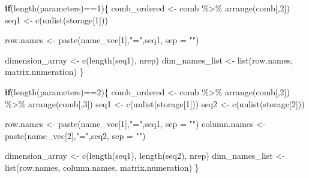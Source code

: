 \documentclass[11pt,a4paper]{article}
\newenvironment{Shaded}{\begin{snugshade}}{\end{snugshade}}
\newcommand{\AttributeTok}[1]{\textcolor[rgb]{0.77,0.63,0.00}{#1}}
\newcommand{\ControlFlowTok}[1]{\textcolor[rgb]{0.13,0.29,0.53}{\textbf{#1}}}
\newcommand{\DecValTok}[1]{\textcolor[rgb]{0.00,0.00,0.81}{#1}}
\newcommand{\FunctionTok}[1]{\textcolor[rgb]{0.00,0.00,0.00}{#1}}
\newcommand{\NormalTok}[1]{#1}
\newcommand{\OtherTok}[1]{\textcolor[rgb]{0.56,0.35,0.01}{#1}}
\newcommand{\SpecialCharTok}[1]{\textcolor[rgb]{0.00,0.00,0.00}{#1}}
\newcommand{\StringTok}[1]{\textcolor[rgb]{0.31,0.60,0.02}{#1}}
\begin{document}
\begin{Shaded}
\begin{Highlighting}[]
  \ControlFlowTok{if}\NormalTok{(}\FunctionTok{length}\NormalTok{(parameters)}\SpecialCharTok{==}\DecValTok{1}\NormalTok{)\{}
\NormalTok{    comb\_ordered }\OtherTok{\textless{}{-}}\NormalTok{  comb }\SpecialCharTok{\%\textgreater{}\%} \FunctionTok{arrange}\NormalTok{(comb[,}\DecValTok{2}\NormalTok{])}
\NormalTok{    seq1 }\OtherTok{\textless{}{-}} \FunctionTok{c}\NormalTok{(}\FunctionTok{unlist}\NormalTok{(storage[}\DecValTok{1}\NormalTok{]))}
    
\NormalTok{    row.names }\OtherTok{\textless{}{-}} \FunctionTok{paste}\NormalTok{(name\_vec[}\DecValTok{1}\NormalTok{],}\StringTok{"="}\NormalTok{,seq1, }\AttributeTok{sep =} \StringTok{""}\NormalTok{)}
    
\NormalTok{    dimension\_array }\OtherTok{\textless{}{-}} \FunctionTok{c}\NormalTok{(}\FunctionTok{length}\NormalTok{(seq1), nrep)}
\NormalTok{    dim\_names\_list }\OtherTok{\textless{}{-}} \FunctionTok{list}\NormalTok{(row.names, matrix.numeration)}
\NormalTok{  \}}
  
  \ControlFlowTok{if}\NormalTok{(}\FunctionTok{length}\NormalTok{(parameters)}\SpecialCharTok{==}\DecValTok{2}\NormalTok{)\{}
\NormalTok{    comb\_ordered }\OtherTok{\textless{}{-}}\NormalTok{  comb }\SpecialCharTok{\%\textgreater{}\%} \FunctionTok{arrange}\NormalTok{(comb[,}\DecValTok{2}\NormalTok{])  }\SpecialCharTok{\%\textgreater{}\%} \FunctionTok{arrange}\NormalTok{(comb[,}\DecValTok{3}\NormalTok{])}
\NormalTok{    seq1 }\OtherTok{\textless{}{-}} \FunctionTok{c}\NormalTok{(}\FunctionTok{unlist}\NormalTok{(storage[}\DecValTok{1}\NormalTok{]))}
\NormalTok{    seq2 }\OtherTok{\textless{}{-}} \FunctionTok{c}\NormalTok{(}\FunctionTok{unlist}\NormalTok{(storage[}\DecValTok{2}\NormalTok{]))}
    
\NormalTok{    row.names }\OtherTok{\textless{}{-}} \FunctionTok{paste}\NormalTok{(name\_vec[}\DecValTok{1}\NormalTok{],}\StringTok{"="}\NormalTok{,seq1, }\AttributeTok{sep =} \StringTok{""}\NormalTok{)}
\NormalTok{    column.names }\OtherTok{\textless{}{-}}  \FunctionTok{paste}\NormalTok{(name\_vec[}\DecValTok{2}\NormalTok{],}\StringTok{"="}\NormalTok{,seq2, }\AttributeTok{sep =} \StringTok{""}\NormalTok{)}
    
\NormalTok{    dimension\_array }\OtherTok{\textless{}{-}} \FunctionTok{c}\NormalTok{(}\FunctionTok{length}\NormalTok{(seq1), }\FunctionTok{length}\NormalTok{(seq2), nrep)}
\NormalTok{    dim\_names\_list }\OtherTok{\textless{}{-}} \FunctionTok{list}\NormalTok{(row.names, column.names, matrix.numeration)}
\NormalTok{  \}}
  

\end{Highlighting}
\end{Shaded}
\end{document}

